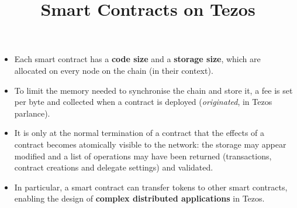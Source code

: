 \documentclass[wide]{slides}
\begin{document}
\begin{slide}
  \title{Smart Contracts on Tezos}

  \begin{itemize}

    \item Each smart contract has a \textbf{code size} and a
      \textbf{storage size}, which are allocated on every node on the
      chain (in their context).

    \item To limit the memory needed to synchronise the chain and
      store it, a fee is set per byte and collected when a contract is
      deployed (\emph{originated}, in Tezos parlance).

    \item It is only at the normal termination of a contract that the
      effects of a contract becomes atomically visible to the network:
      the storage may appear modified and a list of operations may
      have been returned (transactions, contract creations and
      delegate settings) and validated.

    \item In particular, a smart contract can transfer tokens to other
      smart contracts, enabling the design of \textbf{complex
        distributed applications} in Tezos.

  \end{itemize}

\end{slide}
\end{document}
